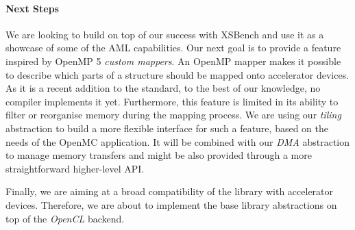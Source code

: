 \paragraph{Next Steps}

We are looking to build on top of our success with XSBench and use it as a
showcase of some of the AML capabilities. Our next goal is to provide a feature
inspired by OpenMP 5 \emph{custom mappers}. An OpenMP mapper makes it possible to
describe which parts of a structure should be mapped onto
accelerator devices. As it is a recent addition to the standard, to the best
of our knowledge, no compiler implements it yet. Furthermore, this feature is
limited in its ability to filter or reorganise memory during the mapping
process. We are using our \emph{tiling} abstraction to build a more
flexible interface for such a feature, based on the needs of the OpenMC
application. It will be combined with our \emph{DMA} abstraction to manage
memory transfers and might be also provided through a more straightforward
higher-level API.

Finally, we are aiming at a broad compatibility of the library with accelerator
devices.  Therefore, we are about to implement the base library abstractions on
top of the \emph{OpenCL} backend.
